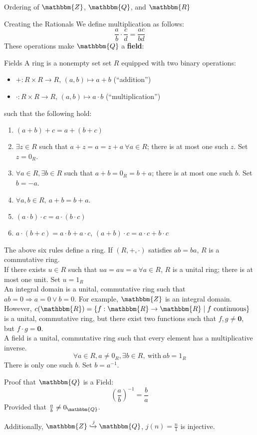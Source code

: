 \documentclass[10pt]{extarticle}
\renewcommand{\mathbf}[1]{\mathbold{#1}}
\newcommand{\Q}{\mathbbm{Q}}
\newcommand{\Z}{\mathbbm{Z}}
\newcommand{\R}{\mathbbm{R}}
\begin{document}
\begin{problem}{Ordering of $\Z$, $\Q$, and $\R$}
\begin{problem}{Creating the Rationals}
      We define multiplication as follows:
      \[
        \frac{a}{b} \cdot \frac{c}{d} = \frac{ac}{bd}
      \] 
      These operations make $\Q$ a \textbf{field}:
  \end{problem}
      \begin{problem}{Fields}
        A ring is a nonempty set set $R$ equipped with two binary operations:
        \begin{itemize}
          \item $+: R\times R \rightarrow R$, $(a,b) \mapsto a+b$ (``addition'')
          \item $\cdot: R\times R \rightarrow R$, $(a,b) \mapsto a\cdot b$ (``multiplication'')
        \end{itemize}
        such that the following hold:
        \begin{enumerate}[(1)]
          \item $(a+b)+c = a+(b+c)$
          \item $\exists z\in R$ such that $a+z = a = z+a~\forall a\in R$; there is at most one such $z$. Set $z = 0_R$.
          \item $\forall a\in R,\exists b\in R$ such that $a+b = 0_R = b+a$; there is at most one such $b$. Set $b = -a$.
          \item $\forall a,b\in R,~a+b = b+a$.
          \item $(a\cdot b)\cdot c = a\cdot(b\cdot c)$
          \item $a\cdot(b+c) = a\cdot b + a\cdot c$, $(a+b)\cdot c = a\cdot c + b\cdot c$
        \end{enumerate}
        The above six rules define a ring. If $(R,+,\cdot)$ satisfies $ab = ba$, $R$ is a commutative ring.\\

        If there exists $u\in R$ such that $ua = au = a~\forall a\in R$, $R$ is a unital ring; there is at most one unit. Set $u = 1_R$\\

        An integral domain is a unital, commutative ring such that $ab = 0 \Rightarrow a=0\vee b=0$. For example, $\Z$ is an integral domain. However, $c(\R) = \{f:\R \rightarrow \R\mid f~\text{continuous}\}$ is a unital, commutative ring, but there exist two functions such that $f,g\neq \mathbf{0}$, but $f\cdot g = \mathbf{0}$.\\

        A field is a unital, commutative ring such that every element has a multiplicative inverse.
        \[
          \forall a\in R, a\neq 0_R,\exists b\in R,~\text{with}~ab = 1_R
        \] 
        There is only one such $b$. Set $b = a^{-1}$.
      \end{problem}
      \begin{problem}{Proof that $\Q$ is a Field:}
        \[
          \left(\frac{a}{b}\right)^{-1} = \frac{b}{a}
        \] 
        Provided that $\frac{a}{b}\neq 0_{\Q}$.
      \end{problem}
      Additionally, $\Z\xhookrightarrow{j}\Q$, $j(n) = \frac{n}{1}$ is injective.
    \end{problem}
\end{document}
